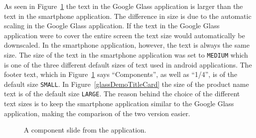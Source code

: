 As seen in Figure~\ref{glassDemoComponentText} the text in the Google Glass application is larger than the text in the smartphone application. The difference in size is due to the automatic scaling in the Google Glass application. If the text in the Google Glass application were to cover the entire screen the text size would automatically be downscaled. In the smartphone application, however, the text is always the same size. The size of the text in the smartphone application was set to \texttt{MEDIUM} which is one of the three different default sizes of text used in android applications. The footer text, which in Figure~\ref{glassDemoComponentText} says ``Components'', as well as ``1/4'', is of the default size \texttt{SMALL}. In Figure~\ref{glassDemoTitleCard} the size of the product name text is of the default size \texttt{LARGE}. The reason behind the choice of the different text sizes is to keep the smartphone application similar to the Google Glass application, making the comparison of the two version easier.

		\begin{figure}[ht!]
		\centering
   		 \qquad
   		 \qquad
		\caption{A component slide from the application.}
		\label{glassDemoComponentText}
	\end{figure}

